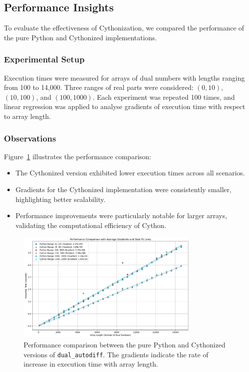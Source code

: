\documentclass[a4paper,12pt]{article}
\begin{document}
\subsection{Performance Insights}
To evaluate the effectiveness of Cythonization, we compared the performance of the pure Python and Cythonized implementations.

\subsubsection{Experimental Setup}
Execution times were measured for arrays of dual numbers with lengths ranging from 100 to 14,000. Three ranges of real parts were considered: \((0,10)\), \((10,100)\), and \((100,1000)\). Each experiment was repeated 100 times, and linear regression was applied to analyse gradients of execution time with respect to array length.

\subsubsection{Observations}
Figure~\ref{fig:performance_comparison} illustrates the performance comparison:
\begin{itemize}
    \item The Cythonized version exhibited lower execution times across all scenarios.
    \item Gradients for the Cythonized implementation were consistently smaller, highlighting better scalability.
    \item Performance improvements were particularly notable for larger arrays, validating the computational efficiency of Cython.
\end{itemize}

\begin{figure}[h!]
    \centering
    \includegraphics[width=0.8\textwidth]{performance_comparison.png}
    \caption{Performance comparison between the pure Python and Cythonized versions of \texttt{dual\_autodiff}. The gradients indicate the rate of increase in execution time with array length.}
    \label{fig:performance_comparison}
\end{figure}
\end{document}

